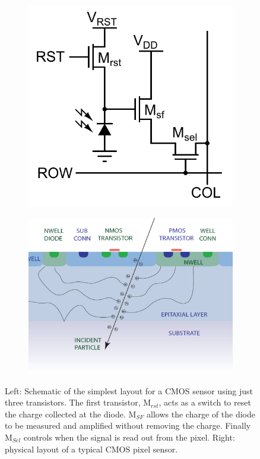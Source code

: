 \begin{figure}
  \centering
  \begin{subfigure}[t]{.45\textwidth}
    \centering
    \includegraphics[width=1\linewidth,keepaspectratio]{DECALStudies/fig/cmos_3Tdesign}
  \end{subfigure}%
  \begin{subfigure}[t]{.45\textwidth}
    \centering
    \includegraphics[width=1\linewidth,keepaspectratio]{DECALStudies/fig/nodeeppwell}
  \end{subfigure}
  \caption[Typical layout of a CMOS sensor]{Left: Schematic of the simplest layout for a \ac{CMOS} sensor using just three transistors. The first transistor, M$_{rst}$, acts as a switch to reset the charge collected at the diode. M$_{SF}$ allows the charge of the diode to be measured and amplified without removing the charge. Finally M$_{Sel}$ controls when the signal is read out from the pixel. Right: physical layout of a typical \ac{CMOS} pixel sensor.}
  \label{fig:cmosdesign}
\end{figure}

